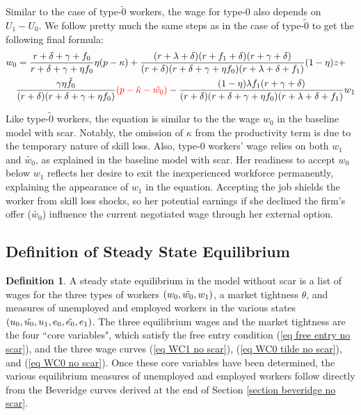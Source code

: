 \documentclass[12pt]{article} %
\theoremstyle{definition}
\newtheorem{definition}{Definition}%
\begin{document}
Similar to the case of type-$\tilde{0}$ workers, the wage for type-0 also depends on ${U_1}-{U_0}$. We follow pretty much the same steps as in the case of type-$\tilde{0}$ to get the following final formula:  
\begin{equation}
    \begin{multlined}
    w_0 = \frac{r+\delta+\gamma +f_0}{r+\delta+\gamma+\eta f_0}\eta (p-\kappa) + \frac{(r+\lambda+\delta)(r+f_1+\delta)(r+\gamma+\delta)}{(r+\delta)(r+\delta+\gamma + \eta f_0)(r+\lambda+\delta+f_1)} (1-\eta) z + \\  
\frac{\gamma \eta \Tilde{f_0}}{(r+\delta)(r+\delta+\gamma + \eta f_0)}\textcolor{red}{(p-\Tilde{\kappa}-\Tilde{w_0})}- \frac{(1-\eta)\lambda f_1 (r+\gamma+\delta)}{(r+\delta)(r+\delta+\gamma + \eta f_0)(r+\lambda+\delta+f_1)} w_1
    \end{multlined}  \label{eq WC0 no scar} 
\end{equation}

Like type-$\tilde{0}$ workers, the equation is similar to the the wage $w_0$ in the baseline model with scar. Notably, the omission of $\kappa$ from the productivity term is due to the temporary nature of skill loss. Also, type-0 workers' wage relies on both ${w_1}$ and $\tilde{w_0}$, as explained in the baseline model with scar. Her readiness to accept $w_0$ below $w_1$ reflects her desire to exit the inexperienced workforce permanently, explaining the appearance of $w_1$ in the equation. Accepting the job shields the worker from skill loss shocks, so her potential earnings if she declined the firm's offer ($\tilde{w_0}$) influence the current negotiated wage through her external option.  


\subsection{Definition of Steady State Equilibrium}\label{section definition of equil} 

\begin{definition}\label{definition equilibrium no scar}
    A steady state equilibrium in the model without scar is a list of wages for the three types of workers $(w_0, \Tilde{w_0}, w_1)$, a market tightness $\theta$, and measures of unemployed and employed workers in the various states $(u_0, \Tilde{u_0}, u_1, e_0, \Tilde{e_0}, e_1)$. The three equilibrium wages and the market tightness are the four ``core variables", which satisfy the free entry condition (\ref{eq free entry no scar}), and the three wage curves (\ref{eq WC1 no scar}), (\ref{eq WC0 tilde no scar}), and (\ref{eq WC0 no scar}). Once these core variables have been determined, the various equilibrium measures of unemployed and employed workers follow directly from the Beveridge curves derived at the end of Section \ref{section beveridge no scar}.  
\end{definition} 
\end{document}
